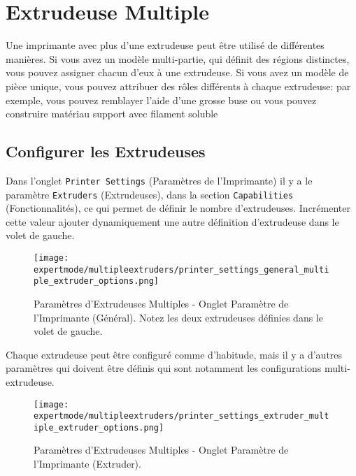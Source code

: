 
\section{Extrudeuse Multiple} %
\label{sec:multiple_extruders}

Une imprimante avec plus d'une extrudeuse peut \^etre utilis\'e de diff\'erentes mani\`eres. Si vous avez un modèle multi-partie, qui définit des régions distinctes, vous pouvez assigner chacun d'eux à une extrudeuse. Si vous avez un modèle de pièce unique, vous pouvez attribuer des rôles différents à chaque extrudeuse: par exemple, vous pouvez remblayer l'aide d'une grosse buse ou vous pouvez construire matériau support avec filament soluble


\subsection{Configurer les Extrudeuses} %
\label{sub:configuring_extruders}

Dans l'onglet \texttt{Printer Settings} (Param\`etres de l'Imprimante) il y a le param\`etre \texttt{Extruders} (Extrudeuses), dans la section \texttt{Capabilities} (Fonctionnalit\'es), ce qui permet de d\'efinir le nombre d'extrudeuses. Incr\'ementer cette valeur ajouter dynamiquement une autre d\'efinition d'extrudeuse dans le volet de gauche.

\begin{figure}[H]
\centering
\texttt{[image: expertmode/multipleextruders/printer\_settings\_general\_multiple\_extruder\_options.png]}
\caption{Param\`etres d'Extrudeuses Multiples - Onglet Param\`etre de l'Imprimante (G\'en\'eral).  Notez les deux extrudeuses d\'efinies dans le volet de gauche.}
\label{fig:printer_settings_general_multiple_extruder_options}
\end{figure}

Chaque extrudeuse peut \^etre configur\'e comme d'habitude, mais il y a d'autres param\`etres qui doivent \^etre d\'efinis qui sont notamment les configurations multi-extrudeuse.

\begin{figure}[H]
\centering
\texttt{[image: expertmode/multipleextruders/printer\_settings\_extruder\_multiple\_extruder\_options.png]}
\caption{Param\`etres d'Extrudeuses Multiples - Onglet Param\`etre de l'Imprimante (Extruder).}
\label{fig:printer_settings_extruder_multiple_extruder_options}
\end{figure}

